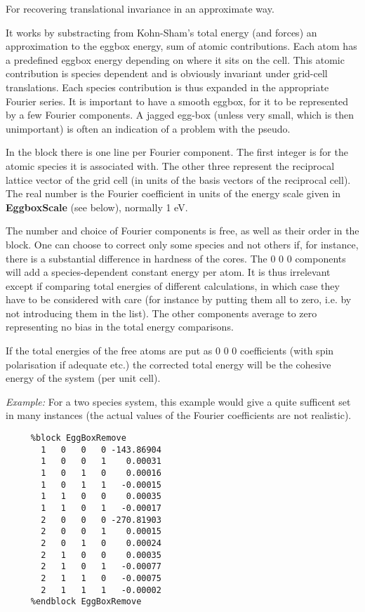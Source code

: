 \begin{description}
For recovering translational invariance in an approximate way.

It works by substracting from Kohn-Sham's total energy (and forces) an
approximation to the eggbox energy, sum of atomic contributions.
Each atom has a predefined eggbox energy depending on where it sits on
the cell. This atomic contribution is species dependent and is
obviously invariant under grid-cell translations. Each species
contribution is thus expanded in the appropriate Fourier series.
It is important to have a smooth eggbox, for it to
be represented by a few Fourier components. A jagged egg-box (unless
very small, which is then unimportant) is often an
indication of a problem with the pseudo.

In the block there is one line per Fourier component. The first integer
is for the atomic species it is associated with. The other three
represent the reciprocal lattice vector of the grid cell (in units
of the basis vectors of the reciprocal cell). The real number is
the Fourier coefficient in units of the energy scale given in
\textbf{EggboxScale} (see below), normally 1 eV.

The number and choice of Fourier components is free, as well as their
order in the block. One can choose to correct only some species and not
others if, for instance, there is a substantial difference in hardness
of the cores. The 0 0 0 components will add a species-dependent
constant energy per atom. It is thus irrelevant except if comparing
total energies of different calculations, in which case they
have to be considered with care (for instance by putting them all to zero,
i.e. by not introducing them in the list).
The other components average to zero representing no bias in the
total energy comparisons.

If the total
energies of the free atoms are put as 0 0 0 coefficients (with
spin polarisation if adequate etc.) the corrected total energy
will be the cohesive energy of the system (per unit cell).

\textit{Example:} For a two species system, this example would give a quite
sufficent set in many instances (the actual values of the Fourier
coefficients are not realistic).

\begin{verbatim}
     %block EggBoxRemove
       1   0   0   0 -143.86904
       1   0   0   1    0.00031
       1   0   1   0    0.00016
       1   0   1   1   -0.00015
       1   1   0   0    0.00035
       1   1   0   1   -0.00017
       2   0   0   0 -270.81903
       2   0   0   1    0.00015
       2   0   1   0    0.00024
       2   1   0   0    0.00035
       2   1   0   1   -0.00077
       2   1   1   0   -0.00075
       2   1   1   1   -0.00002
     %endblock EggBoxRemove
\end{verbatim}


\end{description}
